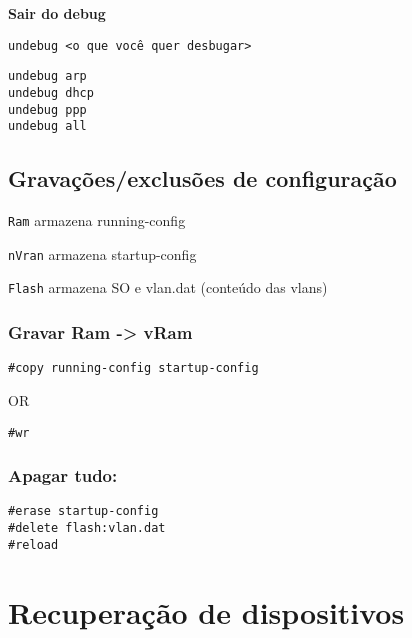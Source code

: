 \documentclass[]{article}
\begin{document}
\textbf{Sair do debug}

\begin{verbatim}
undebug <o que você quer desbugar>
\end{verbatim}

\begin{verbatim}
undebug arp
undebug dhcp
undebug ppp
undebug all
\end{verbatim}

\hypertarget{gravauxe7uxf5esexclusuxf5es-de-configurauxe7uxe3o}{%
\subsection{Gravações/exclusões de
configuração}\label{gravauxe7uxf5esexclusuxf5es-de-configurauxe7uxe3o}}

\texttt{Ram} armazena running-config

\texttt{nVran} armazena startup-config

\texttt{Flash} armazena SO e vlan.dat (conteúdo das vlans)

\hypertarget{gravar-ram---vram}{%
\subsubsection{Gravar Ram -\textgreater{}
vRam}\label{gravar-ram---vram}}

\begin{verbatim}
#copy running-config startup-config 
\end{verbatim}

OR

\begin{verbatim}
#wr 
\end{verbatim}

\hypertarget{apagar-tudo}{%
\subsubsection{Apagar tudo:}\label{apagar-tudo}}

\begin{verbatim}
#erase startup-config 
#delete flash:vlan.dat 
#reload 
\end{verbatim}

\hypertarget{recuperauxe7uxe3o-de-dispositivos}{%
\section{Recuperação de
dispositivos}\label{recuperauxe7uxe3o-de-dispositivos}}
\end{document}
